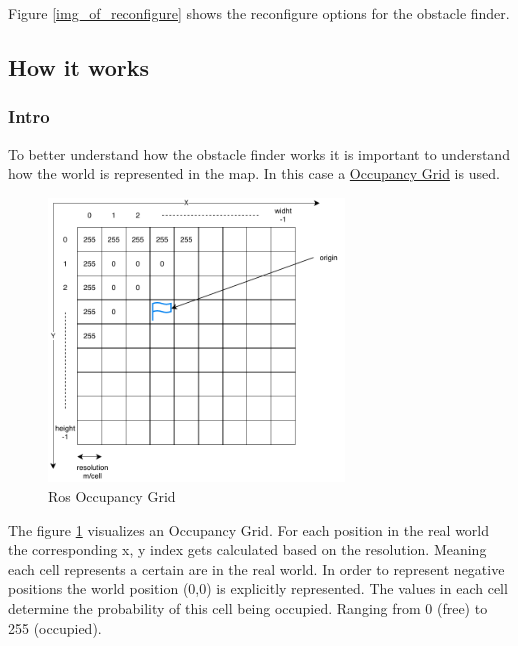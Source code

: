 \documentclass[main.tex]{subfiles}
\begin{document}
		Figure \ref{img_of_reconfigure} shows the reconfigure options for the obstacle finder.
	
		\subsection{How it works}
		
		\subsubsection{Intro}
		
		To better understand how the obstacle finder works it is important to understand how the world is represented in the map. In this case a \href{http://docs.ros.org/kinetic/api/nav_msgs/html/msg/OccupancyGrid.html}{Occupancy Grid} is used.
		
		\begin{figure}[H]
			\centering
			\includegraphics[width=0.7\textwidth]{pictures/obstacle_finder/Gridmap.pdf}
			\caption{Ros Occupancy Grid}
			\label{img_occ_grid}
		\end{figure}
		
		The figure \ref{img_occ_grid} visualizes an Occupancy Grid. For each position in the real world the corresponding x, y index gets calculated based on the resolution. Meaning each cell represents a certain are in the real world. In order to represent negative positions the world position (0,0) is explicitly represented. The values in each cell determine the probability of this cell being occupied. Ranging from 0 (free) to 255 (occupied).
		
\end{document}
